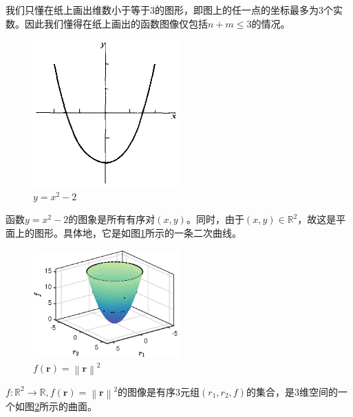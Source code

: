 \documentclass[main.tex]{subfiles}
\begin{document}
我们只懂在纸上画出维数小于等于3的图形，即图上的任一点的坐标最多为3个实数。因此我们懂得在纸上画出的函数图像仅包括$n+m\leq3$的情况。

\begin{figure}[h]
    \centering
    \includegraphics[width=0.5\textwidth]{images/II.10.1.eps}
    \caption{$y=x^2-2$}
    \label{fig:II.10.1}
\end{figure}

\begin{example}
函数$y=x^2-2$的图象是所有有序对$\left(x,y\right)$。同时，由于$\left(x,y\right)\in\mathbb{R}^2$，故这是平面上的图形。具体地，它是如图\ref{fig:II.10.1}所示的一条二次曲线。
\end{example}

\begin{figure}[h]
    \centering
    \includegraphics[width=0.5\textwidth]{images/II.10.2.eps}
    \caption{$f\left(\mathbf{r}\right)=\left\|\mathbf{r}\right\|^2$}
    \label{fig:II.10.2}
\end{figure}

\begin{example}\label{exp:II.12.5}
$f:\mathbb{R}^2\rightarrow\mathbb{R},f\left(\mathbf{r}\right)=\left\|\mathbf{r}\right\|^2$的图像是有序3元组$\left(r_1,r_2,f\right)$的集合，是3维空间的一个如图\ref{fig:II.10.2}所示的曲面。
\end{example}
\end{document}
